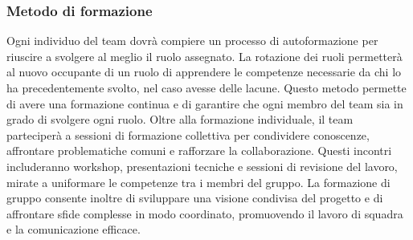 \subsubsection{Metodo di formazione}
Ogni individuo del team dovrà compiere un processo di autoformazione per riuscire a svolgere al meglio il ruolo assegnato. La rotazione dei ruoli permetterà al nuovo occupante di un ruolo di apprendere le competenze necessarie da chi lo ha precedentemente svolto, nel caso avesse delle lacune. Questo metodo permette di avere una formazione continua e di garantire che ogni membro del team sia in grado di svolgere ogni ruolo.
Oltre alla formazione individuale, il team parteciperà a sessioni di formazione collettiva per condividere conoscenze, affrontare problematiche comuni e rafforzare la collaborazione. Questi incontri includeranno workshop, presentazioni tecniche e sessioni di revisione del lavoro, mirate a uniformare le competenze tra i membri del gruppo. La formazione di gruppo consente inoltre di sviluppare una visione condivisa del progetto e di affrontare sfide complesse in modo coordinato, promuovendo il lavoro di squadra e la comunicazione efficace.

